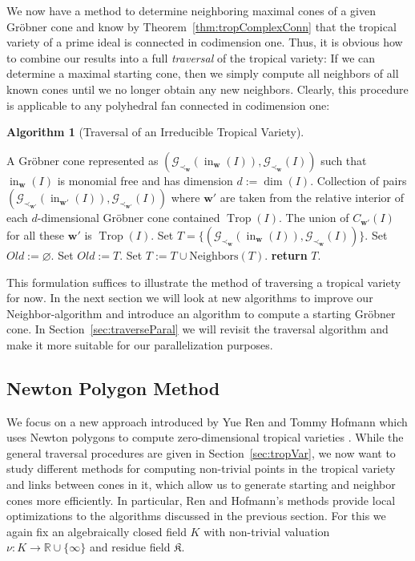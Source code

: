 \documentclass[
  paper=a4,
  titlepage,
  bibliography=totoc,
  pagesize=pdftex
]{scrartcl}
\numberwithin{figure}{section}
\numberwithin{equation}{section}
\numberwithin{table}{section}
\newcommand*\setR{\mathds{R}}
\let\vec\mathbf
\DeclareMathOperator{\Trop}{Trop}
\DeclareMathOperator{\initial}{in}
\theoremstyle{definition}
\newtheorem{algo}[definition]{Algorithm}
\numberwithin{definition}{section}
\begin{document}
We now have a method to determine neighboring maximal cones of a given Gröbner cone and
know by Theorem~\ref{thm:tropComplexConn} that the tropical variety of a prime ideal is
connected in codimension one. Thus, it is obvious how to combine our results into a full
\emph{traversal} of the tropical variety: If we can determine a maximal starting cone,
then we simply compute all neighbors of all known cones until we no longer obtain any new
neighbors. Clearly, this procedure is applicable to any polyhedral fan connected in
codimension one:

\begin{algo}[Traversal of an Irreducible Tropical Variety]\
  \label{alg:traversal}
  \begin{algorithmic}[1]
    \Require A Gröbner cone represented as $(\mathcal G_{\prec_{\vec w}}(\initial_{\vec
      w}(I)), \mathcal G_{\prec_{\vec w}}(I))$ such that $\initial_{\vec w}(I)$ is
      monomial free and has dimension $d:=\dim(I)$.
    \Ensure Collection of pairs $(\mathcal G_{\prec_{\vec w'}}(\initial_{\vec
      w'}(I)), \mathcal G_{\prec_{\vec w'}}(I))$ where $\vec w'$ are taken from the
      relative interior of each $d$-dimensional Gröbner cone contained $\Trop(I)$. The
      union of $C_{\vec w'}(I)$ for all these $\vec w'$ is $\Trop(I)$.
    \State Set $T = \{ (\mathcal G_{\prec_{\vec w}}(\initial_{\vec
      w}(I)), \mathcal G_{\prec_{\vec w}}(I)) \}$.
    \State Set $Old := \varnothing$.
      \State Set $Old := T$.
      \State Set $T := T \cup \mathrm{Neighbors}(T)$.
    \EndWhile
    \State\textbf{return} $T$.
  \end{algorithmic}
\end{algo}

This formulation suffices to illustrate the method of traversing a tropical variety for
now. In the next section we will look at new algorithms to improve our Neighbor-algorithm
and introduce an algorithm to compute a starting Gröbner cone. In
Section~\ref{sec:traverseParal} we will revisit the traversal algorithm and make it more
suitable for our parallelization purposes.

\subsection{Newton Polygon Method}
\label{sec:newtonMethod}

We focus on a new approach introduced by Yue Ren and Tommy Hofmann which uses Newton
polygons to compute zero-dimensional tropical varieties \cite{tropPointsLinks}. While the
general traversal procedures are given in Section~\ref{sec:tropVar}, we now want to study
different methods for computing non-trivial points in the tropical variety and links
between cones in it, which allow us to generate starting and neighbor cones more
efficiently. In particular, Ren and Hofmann's methods provide local optimizations to the
algorithms discussed in the previous section. For this we again fix an algebraically
closed field $K$ with non-trivial valuation $\nu:K\to\setR \cup \{\infty\}$ and residue
field $\mathfrak K$.
\end{document}
